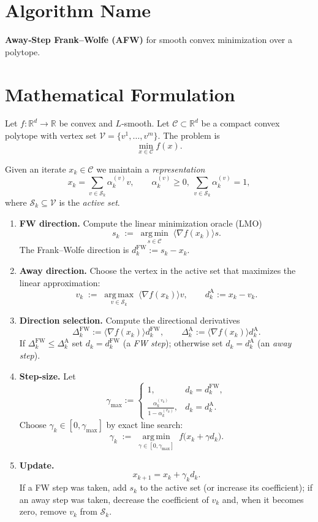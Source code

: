 \documentclass{article}
\newcommand{\R}{\mathbb{R}}
\newcommand{\Cset}{\mathcal{C}}
\newcommand{\grad}{\nabla}
\newcommand{\argmin}{\operatorname*{arg\,min}}
\newcommand{\argmax}{\operatorname*{arg\,max}}
\newcommand{\inner}[1]{\langle #1\rangle}
\begin{document}
\section*{Algorithm Name}
\textbf{Away‑Step Frank–Wolfe (AFW)} for smooth convex minimization over a polytope.

\section*{Mathematical Formulation}
Let $f:\R^{d}\rightarrow\R$ be convex and $L$‑smooth.  
Let $\Cset\subset\R^{d}$ be a compact convex polytope with vertex set $\mathcal{V}=\{v^{1},\dots ,v^{m}\}$.  
The problem is
\[
\min_{x\in\Cset} f(x). \tag{P}
\]

Given an iterate $x_{k}\in\Cset$ we maintain a \emph{representation}
\[
x_{k}= \sum_{v\in\mathcal{S}_{k}} \alpha_{k}^{(v)} v ,\qquad
\alpha_{k}^{(v)}\ge 0,\ \sum_{v\in\mathcal{S}_{k}}\alpha_{k}^{(v)}=1,
\]
where $\mathcal{S}_{k}\subseteq\mathcal{V}$ is the \emph{active set}.

\begin{enumerate}[label=\textbf{Step \arabic*:}, leftmargin=*]
\item \textbf{FW direction.} Compute the linear minimization oracle (LMO)
\[
s_{k}\;:=\;\argmin_{s\in\Cset}\;\inner{\grad f(x_{k})}{s}.
\]
The Frank–Wolfe direction is $d_{k}^{\text{FW}}:=s_{k}-x_{k}$.

\item \textbf{Away direction.} Choose the vertex in the active set that maximizes the linear
approximation:
\[
v_{k}\;:=\;\argmax_{v\in\mathcal{S}_{k}}\;\inner{\grad f(x_{k})}{v},
\qquad
d_{k}^{\text{A}}:=x_{k}-v_{k}.
\]

\item \textbf{Direction selection.} Compute the directional derivatives
\[
\Delta^{\text{FW}}_{k}:=\inner{\grad f(x_{k})}{d_{k}^{\text{FW}}},\qquad
\Delta^{\text{A}}_{k}:=\inner{\grad f(x_{k})}{d_{k}^{\text{A}}}.
\]
If $\Delta^{\text{FW}}_{k}\le \Delta^{\text{A}}_{k}$ set $d_{k}=d_{k}^{\text{FW}}$ (a \emph{FW step});
otherwise set $d_{k}=d_{k}^{\text{A}}$ (an \emph{away step}).

\item \textbf{Step‑size.} Let
\[
\gamma_{\max }:=\begin{cases}
1, & d_{k}=d_{k}^{\text{FW}},\\[4pt]
\displaystyle\frac{\alpha_{k}^{(v_{k})}}{1-\alpha_{k}^{(v_{k})}}, & d_{k}=d_{k}^{\text{A}} .
\end{cases}
\]
Choose $\gamma_{k}\in[0,\gamma_{\max}]$ by exact line search:
\[
\gamma_{k}\;:=\;\argmin_{\gamma\in[0,\gamma_{\max}]}\; f\!\bigl(x_{k}+\gamma d_{k}\bigr).
\]

\item \textbf{Update.}
\[
x_{k+1}=x_{k}+\gamma_{k}d_{k}.
\]
If a FW step was taken, add $s_{k}$ to the active set (or increase its coefficient);
if an away step was taken, decrease the coefficient of $v_{k}$ and, when it becomes
zero, remove $v_{k}$ from $\mathcal{S}_{k}$.
\end{enumerate}
\end{document}
